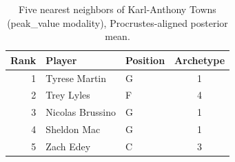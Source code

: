 \begin{table}[htbp]
  \centering\small
  \begin{tabular}{rllc}
    \toprule
    Rank & Player & Position & Archetype \\
    \midrule
    1 & Tyrese Martin & G & 1 \\
    2 & Trey Lyles & F & 4 \\
    3 & Nicolas Brussino & G & 1 \\
    4 & Sheldon Mac & G & 1 \\
    5 & Zach Edey & C & 3 \\
    \bottomrule
  \end{tabular}
  \caption{Five nearest neighbors of Karl-Anthony Towns (peak_value modality), Procrustes-aligned posterior mean.}
  \label{tab:Karl_Anthony_Towns_neighbors_peak_value}
\end{table}

